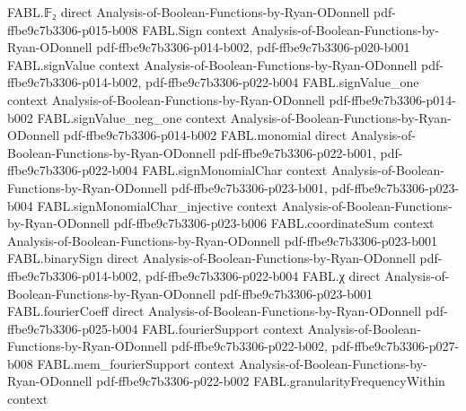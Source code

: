 \begin{theorem}
\label{FABL.expect_ambientRestrictionFourierCoeff}
\leanok
{}
\proofstep
  {FABL.𝔽₂}
  {direct}
  {Analysis-of-Boolean-Functions-by-Ryan-ODonnell}
  {pdf-ffbe9c7b3306-p015-b008}
\proofstep
  {FABL.Sign}
  {context}
  {Analysis-of-Boolean-Functions-by-Ryan-ODonnell}
  {pdf-ffbe9c7b3306-p014-b002,
    pdf-ffbe9c7b3306-p020-b001}
\proofstep
  {FABL.signValue}
  {context}
  {Analysis-of-Boolean-Functions-by-Ryan-ODonnell}
  {pdf-ffbe9c7b3306-p014-b002,
    pdf-ffbe9c7b3306-p022-b004}
\proofstep
  {FABL.signValue_one}
  {context}
  {Analysis-of-Boolean-Functions-by-Ryan-ODonnell}
  {pdf-ffbe9c7b3306-p014-b002}
\proofstep
  {FABL.signValue_neg_one}
  {context}
  {Analysis-of-Boolean-Functions-by-Ryan-ODonnell}
  {pdf-ffbe9c7b3306-p014-b002}
\proofstep
  {FABL.monomial}
  {direct}
  {Analysis-of-Boolean-Functions-by-Ryan-ODonnell}
  {pdf-ffbe9c7b3306-p022-b001,
    pdf-ffbe9c7b3306-p022-b004}
\proofstep
  {FABL.signMonomialChar}
  {context}
  {Analysis-of-Boolean-Functions-by-Ryan-ODonnell}
  {pdf-ffbe9c7b3306-p023-b001,
    pdf-ffbe9c7b3306-p023-b004}
\proofstep
  {FABL.signMonomialChar_injective}
  {context}
  {Analysis-of-Boolean-Functions-by-Ryan-ODonnell}
  {pdf-ffbe9c7b3306-p023-b006}
\proofstep
  {FABL.coordinateSum}
  {context}
  {Analysis-of-Boolean-Functions-by-Ryan-ODonnell}
  {pdf-ffbe9c7b3306-p023-b001}
\proofstep
  {FABL.binarySign}
  {direct}
  {Analysis-of-Boolean-Functions-by-Ryan-ODonnell}
  {pdf-ffbe9c7b3306-p014-b002,
    pdf-ffbe9c7b3306-p022-b004}
\proofstep
  {FABL.χ}
  {direct}
  {Analysis-of-Boolean-Functions-by-Ryan-ODonnell}
  {pdf-ffbe9c7b3306-p023-b001}
\proofstep
  {FABL.fourierCoeff}
  {direct}
  {Analysis-of-Boolean-Functions-by-Ryan-ODonnell}
  {pdf-ffbe9c7b3306-p025-b004}
\proofstep
  {FABL.fourierSupport}
  {context}
  {Analysis-of-Boolean-Functions-by-Ryan-ODonnell}
  {pdf-ffbe9c7b3306-p022-b002,
    pdf-ffbe9c7b3306-p027-b008}
\proofstep
  {FABL.mem_fourierSupport}
  {context}
  {Analysis-of-Boolean-Functions-by-Ryan-ODonnell}
  {pdf-ffbe9c7b3306-p022-b002}
\proofstep
  {FABL.granularityFrequencyWithin}
  {context}

\end{theorem}

